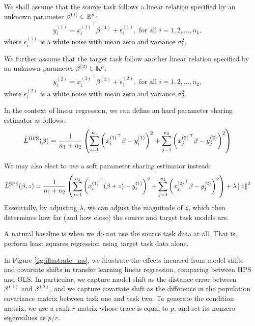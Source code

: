 \begin{example}
    We shall assume that the source task follows a linear relation specified by an unknown parameter $\beta^{(1)} \in \mathbb{R}^p$:
    \begin{align}
        y^{(1)}_i = {x^{(1)}_i}^{\top} \beta^{(1)} + \epsilon^{(1)}_i, \text{ for all } i = 1, 2, \dots, n_1,
    \end{align}
    where $\epsilon_i^{(1)}$ is a white noise with mean zero and variance $\sigma^2_1$.

    We further assume that the target task follow another linear relation specified by an unknown parameter $\beta^{(2)} \in \mathbb{R}^p$:
    \begin{align}
        y^{(2)}_i = {x^{(2)}_i}^{\top} \beta^{(2)} + \epsilon^{(2)}_i, \text{ for all } i = 1, 2, \dots, n_2,
    \end{align}
    where $\epsilon_i^{(2)}$ is a white noise with mean zero and variance $\sigma^2_2$.

    In the context of linear regression, we can define an hard parameter sharing estimator as follows:
    \begin{align}
        \hat L^{\textup{HPS}}(\beta) = \frac 1 {n_1 + n_2} \left( \sum_{i=1}^{n_1} \left( {x^{(1)}_i}^{\top} \beta - y^{(1)}_i \right)^2 + \sum_{j = 1}^{n_2} \left( {x^{(2)}_j}^{\top} \beta - y^{(2)}_j \right)^2 \right)
    \end{align}

    We may also elect to use a soft parameter sharing estimator instead:
    \begin{align}
        \hat L^{\textup{SPS}}(\beta, z) = \frac 1 {n_1 + n_2} \left(  \sum_{i=1}^{n_1} \left( {x^{(1)}_i}^{\top} (\beta + z) - y^{(1)}_i \right)^2 + \sum_{j = 1}^{n_2} \left( {x^{(2)}_j}^{\top} \beta - y^{(2)}_j \right)^2 \right) + \lambda \left\| z \right\|^2
    \end{align}
    Essentially, by adjusting $\lambda$, we can adjust the magnitude of $z$, which then determines how far (and how close) the source and target task models are.
    
    A natural baseline is when we do not use the source task data at all.
    That is, perform least squares regression using target task data alone.
    
    
    In Figure \ref{fig:illustrate_ms}, we illustrate the effects incurred from model shifts and covariate shifts in transfer learning linear regression, comparing between HPS and OLS.
    In particular, we capture model shift as the distance error between $\beta^{(1)}$ and $\beta^{(2)}$, and we capture covariate shift as the difference in the population covariance matrix between task one and task two.
    To generate the condition matrix, we use a rank-$r$ matrix whose trace is equal to $p$, and set its nonzero eigenvalues as $p / r$.
\end{example}

